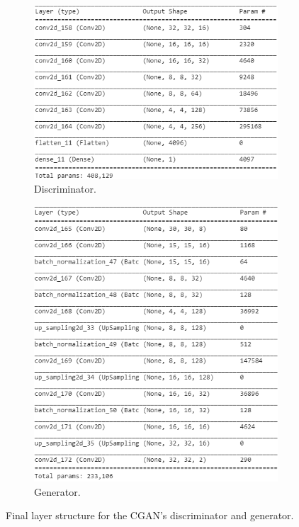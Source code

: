 \documentclass{l4proj}
\begin{document}
\begin{figure}[H]
    \centering
    \begin{subfigure}[b]{0.48\textwidth}
        \includegraphics[width=\textwidth]{images/Discriminator.PNG}
        \caption{Discriminator.}
    \end{subfigure}
    \quad
    \begin{subfigure}[b]{0.48\textwidth}
        \includegraphics[width=\textwidth]{images/Generator.PNG}
        \caption{Generator.}
    \end{subfigure} 
    \caption{Final layer structure for the CGAN's discriminator and generator.}
    \label{fig:gan_structure}
\end{figure}
\end{document}
